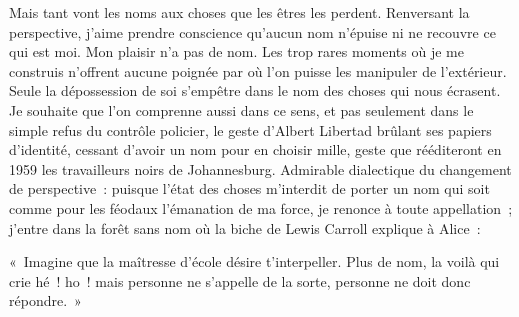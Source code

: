 \documentclass[french,twoside]{book} %
\newenvironment{quoteblock}%
  {\begin{quoting}}
  {\end{quoting}}
\newenvironment{quotebar}{%
    \def\FrameCommand{{\color{rubric!10!}\vrule width 0.5em} \hspace{0.9em}}%
    \def\OuterFrameSep{\itemsep} %
    \MakeFramed {\advance\hsize-\width \FrameRestore}
  }%
  {%
    \endMakeFramed
  }
\renewenvironment{quoteblock}%
  {%
    \savenotes
    \setstretch{0.9}
    \normalfont
    \begin{quotebar}
  }
  {%
    \end{quotebar}
    \spewnotes
  }
\begin{document}
Mais tant vont les noms aux choses que les êtres les perdent. Renversant la perspective, j’aime prendre conscience qu’aucun nom n’épuise ni ne recouvre ce qui est moi. Mon plaisir n’a pas de nom. Les trop rares moments où je me construis n’offrent aucune poignée par où l’on puisse les manipuler de l’extérieur. Seule la dépossession de soi s’empêtre dans le nom des choses qui nous écrasent. Je souhaite que l’on comprenne aussi dans ce sens, et pas seulement dans le simple refus du contrôle policier, le geste d’Albert Libertad brûlant ses papiers d’identité, cessant d’avoir un nom pour en choisir mille, geste que rééditeront en 1959 les travailleurs noirs de Johannesburg. Admirable dialectique du changement de perspective : puisque l’état des choses m’interdit de porter un nom qui soit comme pour les féodaux l’émanation de ma force, je renonce à toute appellation ; j’entre dans la forêt sans nom où la biche de Lewis Carroll explique à Alice :\par

\begin{quoteblock}
\noindent « Imagine que la maîtresse d’école désire t’interpeller. Plus de nom, la voilà qui crie hé ! ho ! mais personne ne s’appelle de la sorte, personne ne doit donc répondre. »\end{quoteblock}
\end{document}
